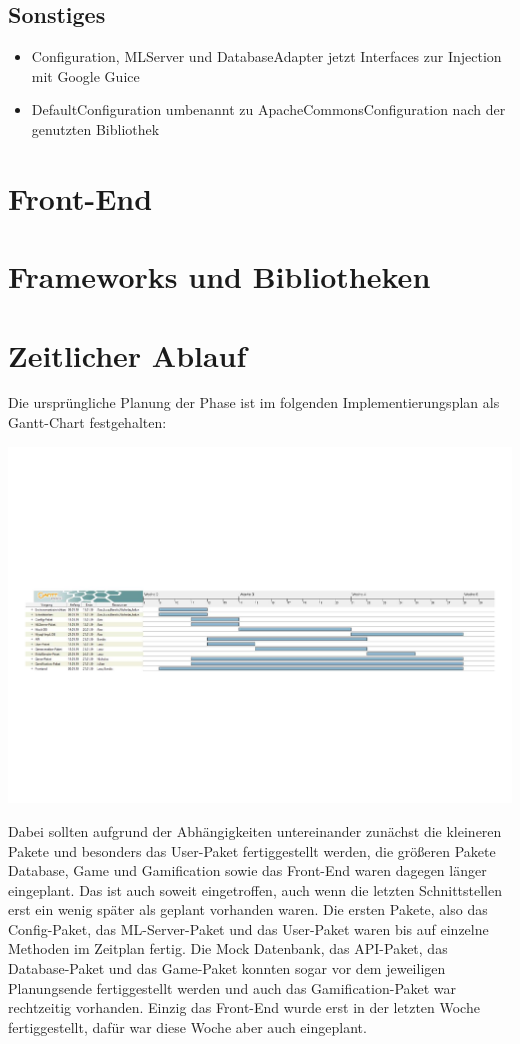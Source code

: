 \documentclass[a4paper]{scrreprt}
\begin{document}
\section{Sonstiges}
\begin{itemize}
    \item Configuration, MLServer und DatabaseAdapter jetzt Interfaces zur Injection mit Google Guice
    \item DefaultConfiguration umbenannt zu ApacheCommonsConfiguration nach der genutzten Bibliothek
\end{itemize}

\chapter{Front-End}

\chapter{Frameworks und Bibliotheken}

\chapter{Zeitlicher Ablauf}
Die ursprüngliche Planung der Phase ist im folgenden Implementierungsplan als Gantt-Chart festgehalten:

\includegraphics[width=\linewidth]{img/gantt.pdf} %

Dabei sollten aufgrund der Abhängigkeiten untereinander zunächst die kleineren Pakete und besonders das User-Paket fertiggestellt werden, die größeren Pakete Database, Game und Gamification sowie das Front-End waren dagegen länger eingeplant. Das ist auch soweit eingetroffen, auch wenn die letzten Schnittstellen erst ein wenig später als geplant vorhanden waren. Die ersten Pakete, also das Config-Paket, das ML-Server-Paket und das User-Paket waren bis auf einzelne Methoden im Zeitplan fertig. Die Mock Datenbank, das API-Paket, das Database-Paket und das Game-Paket konnten sogar vor dem jeweiligen Planungsende fertiggestellt werden und auch das Gamification-Paket war rechtzeitig vorhanden. Einzig das Front-End wurde erst in der letzten Woche fertiggestellt, dafür war diese Woche aber auch eingeplant.
\end{document}
